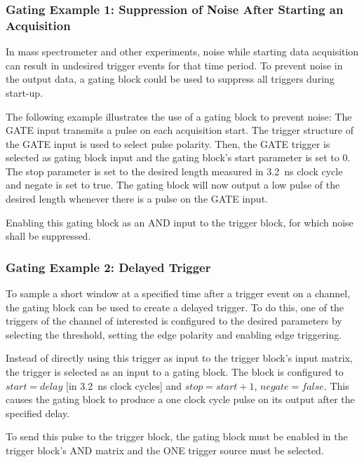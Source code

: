         \subsubsection{Gating Example 1: Suppression of Noise After Starting an Acquisition}

            In mass spectrometer and other experiments, noise while starting data acquisition can result in undesired trigger events for that time period. To prevent noise in the output data, a gating block could be used to suppress all triggers during start-up.\par

            The following example illustrates the use of a gating block to prevent noise: The GATE input transmits a pulse on each acquisition start. The trigger structure of the GATE input is used to select pulse polarity. Then, the GATE trigger is selected as gating block input and the gating block's start parameter is set to 0. The stop parameter is set to the desired length measured in 3.2~ns clock cycle and negate is set to true. The gating block will now output a low pulse of the desired length whenever there is a pulse on the GATE input.\par

        Enabling this gating block as an AND input to the trigger block, for which noise shall be suppressed.

        \subsubsection{Gating Example 2: Delayed Trigger}

            To sample a short window at a specified time after a trigger event on a channel, the gating block can be used to create a delayed trigger. To do this, one of the triggers of the channel of interested is configured to the desired parameters by selecting the threshold, setting the edge polarity and enabling edge triggering.\par

            Instead of directly using this trigger as input to the trigger block's input matrix, the trigger is selected as an input to a gating block. The block is configured to $start = delay$ [in 3.2~ns clock cycles] and $stop = start+1$, $negate = false$. This causes the gating block to produce a one clock cycle pulse on its output after the specified delay.\par

            To send this pulse to the trigger block, the gating block must be enabled in the trigger block's AND matrix and the ONE trigger source must be selected.

